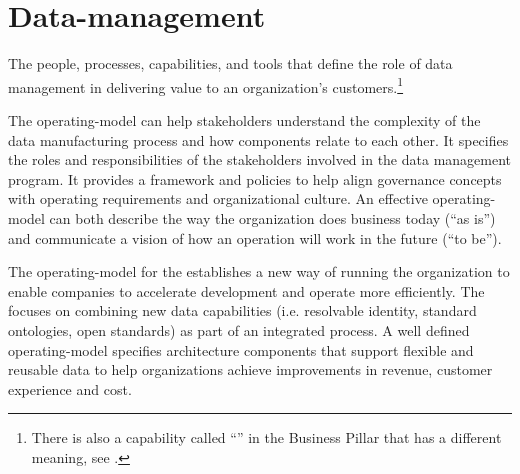 \section[Operating Model]{Data-management }\label{sec:ekg-mm-b-4-1} %

The people, processes, capabilities, and tools that define the role of data management in delivering value to an
organization’s customers.\footnote{%
    There is also a capability called ``'' in the
    Business Pillar that has a different meaning, see .
}

The \gls{operating-model} can help stakeholders understand the complexity of the data manufacturing process and how
components relate to each other.
It specifies the roles and responsibilities of the stakeholders involved in the data management program.
It provides a framework and policies to help align governance concepts with operating requirements and
organizational culture.
An effective \gls{operating-model} can both describe the way the organization does business today (“as is”) and
communicate a vision of how an operation will work in the future (“to be”).

\ekgmmContextSection

The \gls{operating-model} for the  establishes a new way of running the organization
to enable companies to accelerate development and operate more efficiently.
The   focuses on
combining new data capabilities (i.e. resolvable identity, standard ontologies, open standards)
as part of an integrated process.
A well defined \gls{operating-model} specifies architecture components that support flexible and reusable data to help
organizations achieve improvements in revenue, customer experience and cost.

\kgmmcorequestionssection

